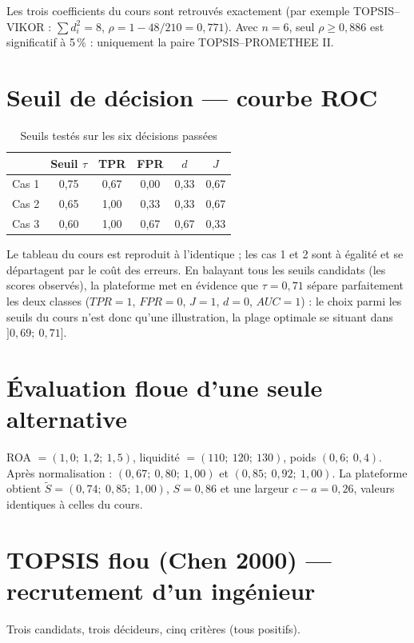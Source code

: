 \documentclass[11pt,a4paper]{report}
\theoremstyle{definition}
\theoremstyle{remark}
\begin{document}
Les trois coefficients du cours sont retrouvés exactement (par exemple TOPSIS--VIKOR :
$\sum d_i^2=8$, $\rho=1-48/210=0{,}771$). Avec $n=6$, seul $\rho\ge0{,}886$ est significatif à 5\,\% :
uniquement la paire TOPSIS--PROMETHEE II.

\section{Seuil de décision --- courbe ROC}

\begin{table}[H]
\centering
\caption{Seuils testés sur les six décisions passées}\label{tab:roc}
\begin{tabular}{lccccc}
\toprule
 & Seuil $\tau$ & TPR & FPR & $d$ & $J$\\
\midrule
Cas 1 & 0,75 & 0,67 & 0,00 & 0,33 & 0,67\\
Cas 2 & 0,65 & 1,00 & 0,33 & 0,33 & 0,67\\
Cas 3 & 0,60 & 1,00 & 0,67 & 0,67 & 0,33\\
\bottomrule
\end{tabular}
\end{table}

Le tableau du cours est reproduit à l'identique ; les cas 1 et 2 sont à égalité et se départagent par le
coût des erreurs. En balayant tous les seuils candidats (les scores observés), la plateforme met en
évidence que $\tau=0{,}71$ sépare parfaitement les deux classes ($TPR=1$, $FPR=0$, $J=1$, $d=0$,
$AUC=1$) : le choix parmi les seuils du cours n'est donc qu'une illustration, la plage optimale se situant
dans $]0{,}69;\ 0{,}71]$.

\section{Évaluation floue d'une seule alternative}

ROA $=(1{,}0;\ 1{,}2;\ 1{,}5)$, liquidité $=(110;\ 120;\ 130)$, poids $(0{,}6;\ 0{,}4)$. Après
normalisation : $(0{,}67;\ 0{,}80;\ 1{,}00)$ et $(0{,}85;\ 0{,}92;\ 1{,}00)$. La plateforme obtient
$\tilde S=(0{,}74;\ 0{,}85;\ 1{,}00)$, $S=0{,}86$ et une largeur $c-a=0{,}26$, valeurs identiques à
celles du cours.

\section{TOPSIS flou (Chen 2000) --- recrutement d'un ingénieur}

Trois candidats, trois décideurs, cinq critères (tous positifs).
\end{document}
